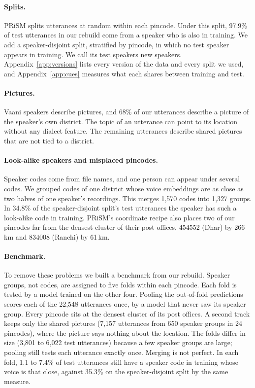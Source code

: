 \documentclass[11pt]{article}
\begin{document}
\paragraph{Splits.} PRiSM splits utterances at random within each pincode. Under this split, 97.9\% of test
utterances in our rebuild come from a speaker who is also in training. We add a speaker-disjoint split,
stratified by pincode, in which no test speaker appears in training. We call its test speakers new speakers.
Appendix~\ref{app:versions} lists every version of the data and every split we used, and
Appendix~\ref{app:cues} measures what each shares between training and test.

\paragraph{Pictures.} Vaani speakers describe pictures, and 68\% of our utterances describe a picture of the
speaker's own district. The topic of an utterance can point to its location without any dialect
feature. The remaining utterances describe shared pictures that are not tied to a district.

\paragraph{Look-alike speakers and misplaced pincodes.} Speaker codes come from file names, and one person can
appear under several codes. We grouped codes of one district whose voice embeddings are as close as two halves
of one speaker's recordings. This merges 1,570 codes into 1,327 groups. In 34.8\% of the speaker-disjoint split's
test utterances the speaker has such a look-alike code in training. PRiSM's coordinate recipe also places two of
our pincodes far from the densest cluster of their post offices, 454552 (Dhar) by 266\,km and 834008 (Ranchi) by
61\,km.

\paragraph{Benchmark.} To remove these problems we built a benchmark from our rebuild. Speaker groups, not codes,
are assigned to five folds within each pincode. Each fold is tested by a model trained on the other four. Pooling the
out-of-fold predictions scores each of the 22,548 utterances once, by a model that never saw its speaker group. Every pincode sits at the densest cluster of its post offices. A second track keeps only the shared
pictures (7,157 utterances from 650 speaker groups in 24 pincodes), where the picture says nothing about the
location. The folds differ in size (3,801 to 6,022 test utterances) because a few speaker groups
are large; pooling still tests each utterance exactly once. Merging is not perfect. In each fold, 1.1 to 7.4\% of
test utterances still have a speaker code in training whose voice is that close, against 35.3\% on the
speaker-disjoint split by the same measure.
\end{document}

